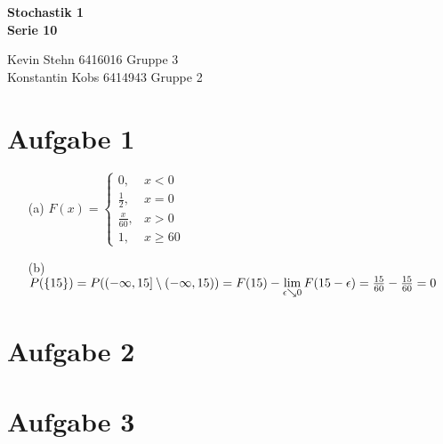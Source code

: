 \documentclass[10pt,a4paper]{article}
\begin{document}
\begin{center}
\textbf{Stochastik 1 \\ Serie 10 \\}
\end{center}

\begin{flushright}
Kevin Stehn 6416016 Gruppe 3 \\
Konstantin Kobs 6414943 Gruppe 2
\end{flushright}

\section*{Aufgabe 1}
\begin{itemize}
\item[(a)]
$ F(x)=\left\{\begin{array}{cl} 0, & x < 0\\ 
\frac{1}{2}, & x = 0 \\ 
\frac{x}{60}, & x > 0 \\
1 , & x \geq 60 \end{array}\right.$
\item[(b)]$P(\{15\}) = P((-\infty,15] \setminus (-\infty,15)) \\
= F(15) - \lim\limits_{\epsilon \searrow 0 }{F(15-\epsilon)}\\
= \frac{15}{60} - \frac{15}{60} = 0$
\end{itemize}

\section*{Aufgabe 2}


\section*{Aufgabe 3}
\end{document}
